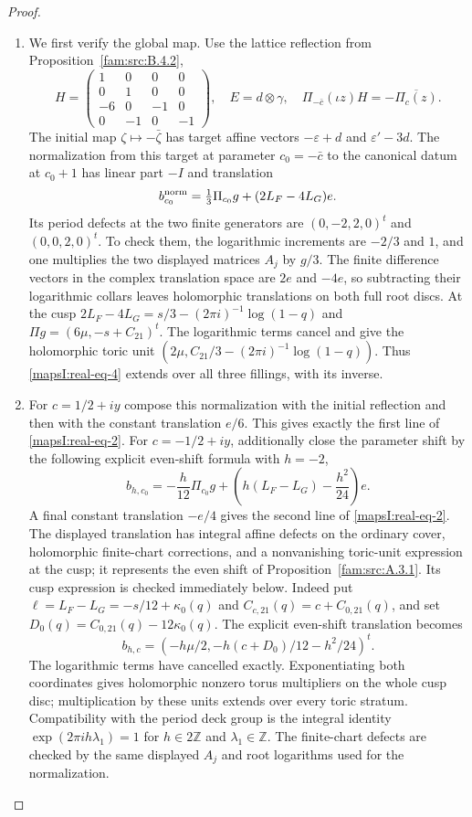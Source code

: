 \begin{proof}
\begin{enumerate}[label=\arabic*.,leftmargin=*]
\item We first verify the global map. Use the lattice reflection from Proposition~\ref{fam:src:B.4.2},
\[
 H=\begin{pmatrix}1&0&0&0\\0&1&0&0\\-6&0&-1&0\\0&-1&0&-1\end{pmatrix},
 \quad E=d\otimes\gamma,
 \quad\Pi_{-\bar c}(\iota z)H=-\overline{\Pi_c(z)}.
\]
The initial map $\zeta\mapsto-\bar\zeta$ has target affine vectors
$-\varepsilon+d$ and $\varepsilon'-3d$. The normalization from this
target at parameter $c_0=-\bar c$ to the canonical datum at $c_0+1$
has linear part $-I$ and translation
\[
 b^{\rm norm}_{c_0}=\tfrac13\Pi_{c_0}g+(2L_F-4L_G)e.
 \label{mapsI:real-eq-4}
\]
Its period defects at the two finite generators are
$(0,-2,2,0)^t$ and $(0,0,2,0)^t$. To check them, the logarithmic increments
are $-2/3$ and $1$, and one multiplies the two displayed matrices $A_j$
by $g/3$. The finite difference vectors in the complex translation space are $2e$ and $-4e$, so subtracting
their logarithmic collars leaves holomorphic translations on both full
root discs. At the cusp
$2L_F-4L_G=s/3-(2\pi i)^{-1}\log(1-q)$ and
$\Pi g=(6\mu,-s+C_{21})^t$. The logarithmic terms cancel and give the
holomorphic toric unit
$(2\mu,C_{21}/3-(2\pi i)^{-1}\log(1-q))$.
Thus \eqref{mapsI:real-eq-4} extends over all three fillings, with its inverse.

\item For $c=1/2+iy$ compose this normalization with the initial reflection
and then with the constant translation $e/6$. This gives exactly the
first line of \eqref{mapsI:real-eq-2}. For $c=-1/2+iy$, additionally close the parameter
shift by the following explicit even-shift formula with $h=-2$,
\[
 b_{h,c_0}=-\frac h{12}\Pi_{c_0}g+
 \left(h(L_F-L_G)-\frac{h^2}{24}\right)e.
\]
A final constant translation $-e/4$ gives the second line of \eqref{mapsI:real-eq-2}.
The displayed translation has integral affine defects on the ordinary cover, holomorphic finite-chart corrections, and a nonvanishing toric-unit expression at the cusp; it represents the even shift of Proposition~\ref{fam:src:A.3.1}. Its cusp expression is checked immediately below. Indeed put $\ell=L_F-L_G=-s/12+\kappa_0(q)$ and
$C_{c,21}(q)=c+C_{0,21}(q)$, and set
$D_0(q)=C_{0,21}(q)-12\kappa_0(q)$.
The explicit even-shift translation becomes
\[
 b_{h,c}=
 \left(-h\mu/2,-h(c+D_0)/12-h^2/24\right)^t.
\]
The logarithmic terms have cancelled exactly. Exponentiating both
coordinates gives holomorphic nonzero torus multipliers on the whole cusp
disc; multiplication by these units extends over every toric stratum.
Compatibility with the period deck group is the integral identity
$\exp(2\pi i h\lambda_1)=1$ for $h\in2\mathbb Z$ and
$\lambda_1\in\mathbb Z$. The finite-chart defects are checked by the
same displayed $A_j$ and root logarithms used for the normalization.


\end{enumerate}
\end{proof}
